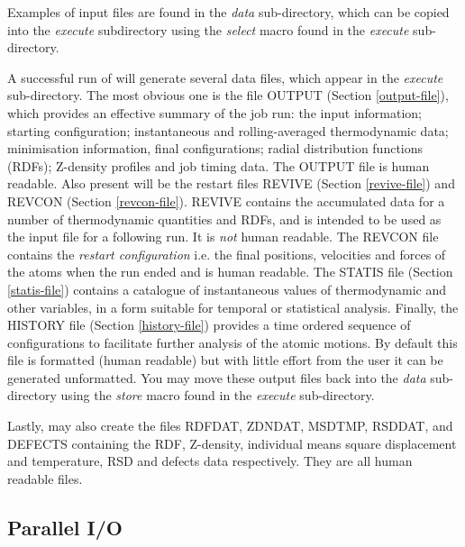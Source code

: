 Examples of input files are found in the {\em data} sub-directory,
which can be copied into the {\em execute} subdirectory using the {\sl
select} macro found in the {\em execute} sub-directory.

A successful run of \D will generate several data files, which
appear in the {\em execute} sub-directory.  The most obvious one
is the file OUTPUT (Section \ref{output-file}), which provides an
effective summary of the job run: the input information; starting
configuration; instantaneous and rolling-averaged thermodynamic
data; minimisation information, final configurations;
radial distribution functions (RDFs); Z-density profiles
and job timing data.  The OUTPUT file is human readable.  Also
present will be the restart files REVIVE (Section
\ref{revive-file}) and REVCON (Section \ref{revcon-file}).  REVIVE
contains the accumulated data for a number of thermodynamic
quantities and RDFs, and is intended to be used as the input file
for a following run.  It is {\em not} human readable.  The REVCON
file contains the {\em restart configuration} i.e. the final
positions, velocities and forces of the atoms when the run ended
and is human readable.  The STATIS file (Section
\ref{statis-file}) contains a catalogue of instantaneous values of
thermodynamic and other variables, in a form suitable for temporal
or statistical analysis.  Finally, the HISTORY file (Section
\ref{history-file}) provides a time ordered sequence of
configurations to facilitate further analysis of the atomic
motions.  By default this file is formatted (human readable) but
with little effort from the user it can be generated unformatted.
You may move these output files back into the {\em data}
sub-directory using the {\sl store} macro found in the {\em
execute} sub-directory.

Lastly, \D may also create the files RDFDAT, ZDNDAT, MSDTMP, RSDDAT,
and DEFECTS containing the RDF, Z-density, individual means square
displacement and temperature, RSD and defects data respectively.  They
are all human readable files.

\subsection{Parallel I/O}

